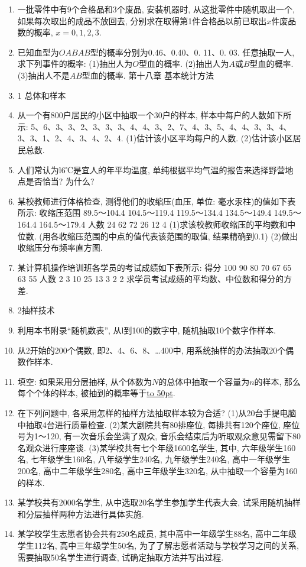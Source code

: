 \documentclass[10pt,a4paper]{article}
\newcommand{\blank}[1]{\underline{\hbox to #1pt{}}}
\begin{document}
\begin{enumerate}[1.]
\item 一批零件中有9个合格品和3个废品, 安装机器时, 从这批零件中随机取出一个, 如果每次取出的成品不放回去, 分别求在取得第1件合格品以前已取出$x$件废品数的概率, $x=0,1,2,3$.
\item 已知血型为$OABAB$型的概率分别为0.46、0.40、0. 11、0. 03. 任意抽取一人, 求下列事件的概率:
(1)抽出人为$O$型血的概率.
(2)抽出人为$A$或$B$型血的概率.
(3)抽出人不是$AB$型血的概率.
第十八章  基本统计方法
\item 1  总体和样本
\item 从一个有800户居民的小区中抽取一个30户的样本, 样本中每户的人数如下所示: 5、6、3、3、2、3、3、3、4、4、3、2、7、4、3、5、4、4、3、3、4、3、3、1、2、4、3、4、2、4.
(1)估计该小区平均每户的人数.
(2)估计该小区居民总数.
\item 人们常认为l6℃是宜人的年平均温度, 单纯根据平均气温的报告来选择野营地点是否恰当? 为什么?
\item 某校教师进行体格检查, 测得他们的收缩压(血压, 单位: 毫水汞柱)的值如下表所示:
收缩压范围	89.5～104.4	104.5～119.4	119.5～134.4	134.5～149.4	149.5～164.4	164.5～179.4
人数	24	62	72	26	12	4
(1)求该校教师收缩压的平均数和中位数. (用各收缩压范围的中点的值代表该范围的取值, 结果精确到0.1)
(2)做出收缩压分布频率直方图.
\item 某计算机操作培训班各学员的考试成绩如下表所示:
得分	100	90	80	70	67	65	63	55
人数	2	3	10	25	13	3	2	2
求学员考试成绩的平均数、中位数和得分的方差.
\item 2抽样技术
\item 利用本书附录``随机数表'', 从l到100的数字中, 随机抽取10个数字作样本.
\item 从2开始的200个偶数, 即2、4、6、8、…400中, 用系统抽样的办法抽取20个偶数作样本.
\item 填空:
如果采用分层抽样, 从个体数为$N$的总体中抽取一个容量为$n$的样本, 那么每个个体的样本, 被抽到的概率等于\blank{50}.
\item 在下列问题中, 各采用怎样的抽样方法抽取样本较为合适?
(1)从20台手提电脑中抽取4台进行质量检查.
(2)某大剧院共有80排座位, 每排共有120个座位, 座位号为1～120, 有一次音乐会坐满了观众, 音乐会结束后为听取观众意见需留下80名观众进行座座谈.
(3)某学校共有七个年级1600名学生, 其中, 六年级学生160名, 七年级学生160名, 八年级学生240名, 九年级学生240名, 高中一年级学生200名, 高中二年级学生280名, 高中三年级学生320名, 从中抽取一个容量为160的样本.
\item 某学校共有2000名学生, 从中选取20名学生参加学生代表大会, 试采用随机抽样和分层抽样两种方法进行具体实施.
\item 某学校学生志愿者协会共有250名成员, 其中高中一年级学生88名, 高中二年级学生112名, 高中三年级学生50名, 为了了解志愿者活动与学校学习之间的关系, 需要抽取50名学生进行调查, 试确定抽取方法并写出过程.

\end{enumerate}
\end{document}
